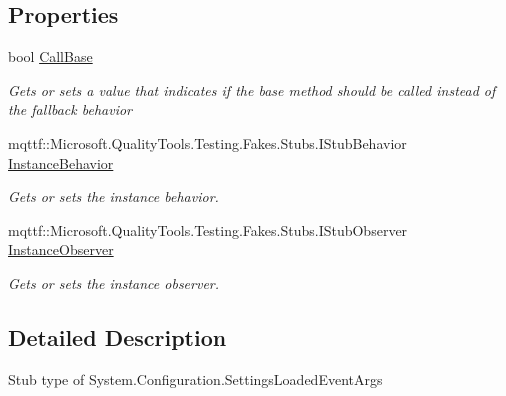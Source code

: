 \subsection*{Properties}
\begin{DoxyCompactItemize}
\item 
bool \hyperlink{class_system_1_1_configuration_1_1_fakes_1_1_stub_settings_loaded_event_args_a230bb2f7bb9835183d9ae9c92a2cc828}{Call\-Base}
\begin{DoxyCompactList}\small\item\em Gets or sets a value that indicates if the base method should be called instead of the fallback behavior\end{DoxyCompactList}\item 
mqttf\-::\-Microsoft.\-Quality\-Tools.\-Testing.\-Fakes.\-Stubs.\-I\-Stub\-Behavior \hyperlink{class_system_1_1_configuration_1_1_fakes_1_1_stub_settings_loaded_event_args_ad84602dcb88f5ace0425395b483807c5}{Instance\-Behavior}
\begin{DoxyCompactList}\small\item\em Gets or sets the instance behavior.\end{DoxyCompactList}\item 
mqttf\-::\-Microsoft.\-Quality\-Tools.\-Testing.\-Fakes.\-Stubs.\-I\-Stub\-Observer \hyperlink{class_system_1_1_configuration_1_1_fakes_1_1_stub_settings_loaded_event_args_ae1aef1f906331526557f06ee6fe00dee}{Instance\-Observer}
\begin{DoxyCompactList}\small\item\em Gets or sets the instance observer.\end{DoxyCompactList}\end{DoxyCompactItemize}


\subsection{Detailed Description}
Stub type of System.\-Configuration.\-Settings\-Loaded\-Event\-Args




